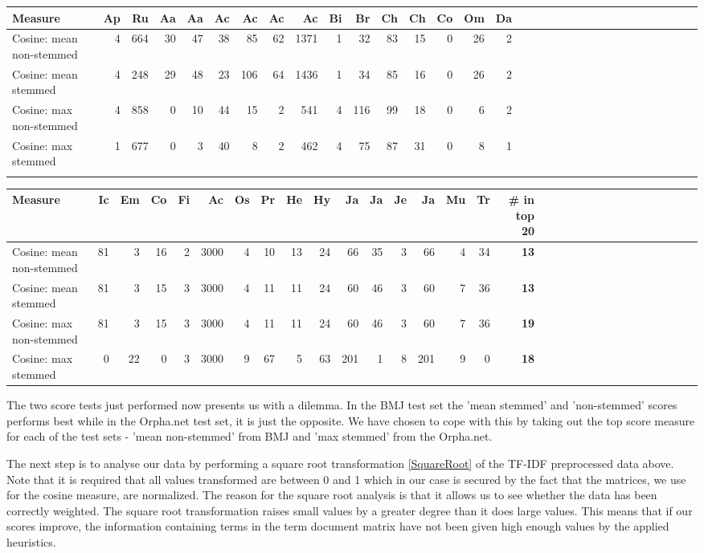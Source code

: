 \begin{table}[H]
\label{testResult_termDoc_orphan_hist_3000_ns_mea_s_mea_ns_max_s_max}
\begin{tiny}
  \begin{tabular}{|l|r|r|r|r|r|r|r|r|r|r|r|r|r|r|r|r|r|r|r|r|r|r|r|r|r|r|r|r|r|r|r|}
    \hline
    Measure &Ap&Ru&Aa&Aa&Ac&Ac&Ac&Ac&Bi&Br&Ch&Ch&Co&Om&Da\\
    \hline
    Cosine: mean non-stemmed &4&664&30&47&38&85&62&1371&1&32&83&15&0&26&2\\
    \hline
    Cosine: mean stemmed &4&248&29&48&23&106&64&1436&1&34&85&16&0&26&2\\
    \hline
    Cosine: max non-stemmed &4&858&0&10&44&15&2&541&4&116&99&18&0&6&2\\
    \hline
    Cosine: max stemmed &1&677&0&3&40&8&2&462&4&75&87&31&0&8&1 \\
    \hline
    \multicolumn{16}{c}{} \\
    \end{tabular}
    \begin{tabular}{|l|r|r|r|r|r|r|r|r|r|r|r|r|r|r|r|r|r|r|r|r|r|r|r|r|r|r|r|r|r|r|}
    \hline
     Measure &Ic&Em&Co&Fi&Ac&Os&Pr&He&Hy&Ja&Ja&Je&Ja&Mu&Tr &\scriptsize{\textbf{\# in top 20}} \\
    \hline
    Cosine: mean non-stemmed  &81&3&16&2&3000&4&10&13&24&66&35&3&66&4&34 & \scriptsize{\textbf{13}} \\
    \hline
    Cosine: mean stemmed &81&3&15&3&3000&4&11&11&24&60&46&3&60&7&36 & \scriptsize{\textbf{13}} \\
    \hline
    Cosine: max non-stemmed &81&3&15&3&3000&4&11&11&24&60&46&3&60&7&36 & \scriptsize{\textbf{19}} \\
    \hline
    Cosine: max stemmed &0&22&0&3&3000&9&67&5&63&201&1&8&201&9&0 & \scriptsize{\textbf{18}} \\
    \hline
  \end{tabular}
\end{tiny}
\end{table}

The two score tests just performed now presents us with a dilemma. In the BMJ test set 
the 'mean stemmed' and 'non-stemmed' scores performs best while in the Orpha.net test set, 
it is just the opposite. We have chosen to cope with this by taking out the top score 
measure for each of the test sets - 'mean non-stemmed' from BMJ and 'max stemmed' from 
the Orpha.net.

The next step is to analyse our data by performing a square root transformation 
\ref{SquareRoot} of the TF-IDF preprocessed data above. Note that it is required that 
all values transformed are between 0 and 1 which in our case is secured by the fact 
that the matrices, we use for the cosine measure, are normalized. The reason for the 
square root analysis is that it allows us to see whether the data has been correctly 
weighted. The square root transformation raises small values by a greater degree than 
it does large values. This means that if our scores improve, the information containing 
terms in the term document matrix have not been given high enough values by the applied 
heuristics.

